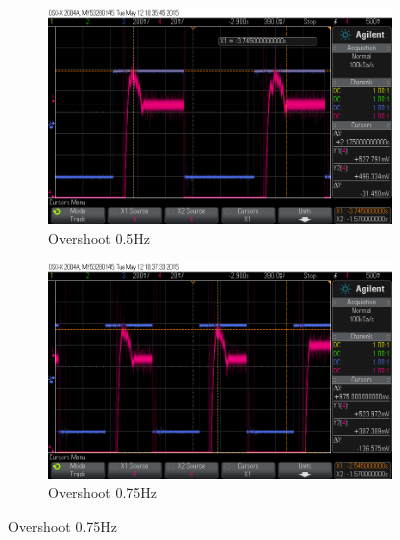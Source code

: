 \documentclass[11pt,a4paper]{article}
\begin{document}
\begin{enumerate}
\begin{figure}[H]
  \begin{subfigure}{0.5\textwidth}
  \includegraphics[width=0.95\linewidth]{Oscilloscope/PartD_0_5Hz_Overshoot.png} 
  \caption{Overshoot 0.5Hz}
  \label{fig:subim1}
  \end{subfigure}	  
  \begin{subfigure}{0.5\textwidth}
  \includegraphics[width=0.95\linewidth]{Oscilloscope/PartD_0_75Hz_Overshoot.png}
  \caption{Overshoot 0.75Hz}
  \label{fig:subim2}
  \end{subfigure}
  

\end{figure}
\end{enumerate}
\end{document}
